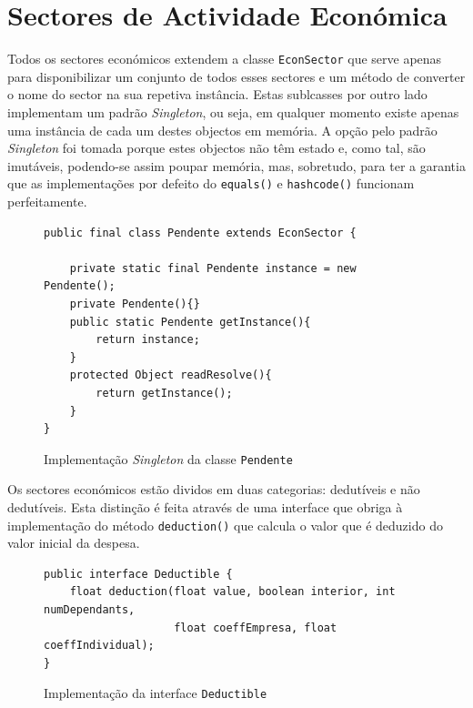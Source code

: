 \documentclass[12pt,a4paper]{report}
\begin{document}
\pagebreak

    \section{Sectores de Actividade Económica}
    \label{sec:econsector}
    Todos os sectores económicos extendem a classe \texttt{EconSector}
    que serve apenas para disponibilizar um conjunto de todos esses sectores e um
    método de converter o nome do sector na sua repetiva instância.
    Estas sublcasses por outro lado implementam um padrão \textit{Singleton}, ou
    seja, em qualquer momento existe apenas uma instância de cada um destes
    objectos em memória. A opção pelo padrão \textit{Singleton} foi tomada porque
    estes objectos não têm estado e, como tal, são imutáveis, podendo-se assim
    poupar memória, mas, sobretudo, para ter a garantia que as implementações por
    defeito do \texttt{equals()} e \texttt{hashcode()}
    funcionam perfeitamente.
    \begin{figure}[h]
        \begin{verbatim}
public final class Pendente extends EconSector {

    private static final Pendente instance = new Pendente();
    private Pendente(){}
    public static Pendente getInstance(){
        return instance;
    }
    protected Object readResolve(){
        return getInstance();
    }
}
        \end{verbatim}
        \caption{Implementação \textit{Singleton} da classe
                \texttt{Pendente}}
        \label{fig:singleton}
    \end{figure}

    Os sectores económicos estão dividos em duas categorias: dedutíveis
    e não dedutíveis. Esta distinção é feita através de uma interface que
    obriga à implementação do método \texttt{deduction()} que calcula
    o valor que é deduzido do valor inicial da despesa.
    \begin{figure}[h]
        \begin{verbatim}
public interface Deductible {
    float deduction(float value, boolean interior, int numDependants,
                    float coeffEmpresa, float coeffIndividual);
}
        \end{verbatim}
        \caption{Implementação da interface \texttt{Deductible}}
        \label{fig:deductible}
    \end{figure}
\end{document}
